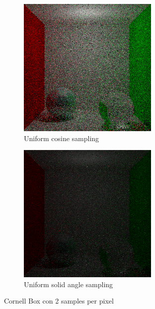 \documentclass{article}
\begin{document}
\begin{figure}
\begin{subfigure}[h]{0.4\linewidth}
\includegraphics[width=\linewidth]{imgs/cosine_box2.png}
\caption{Uniform cosine sampling}
\end{subfigure}
\hfill
\begin{subfigure}[h]{0.4\linewidth}
\includegraphics[width=\linewidth]{imgs/solid_angle_box2.png}
\caption{Uniform solid angle sampling}
\end{subfigure}%
\caption{Cornell Box con 2 samples per pixel}
\end{figure}
\end{document}
